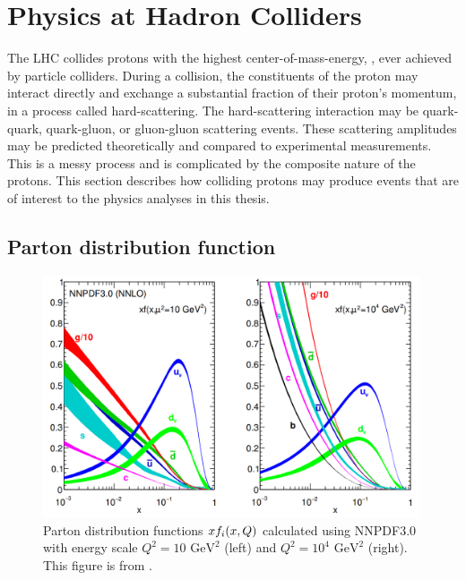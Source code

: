\section{Physics at Hadron Colliders}

The LHC collides protons with the highest center-of-mass-energy, \sqrts, ever achieved by particle colliders.
During a collision, the constituents of the proton may interact directly and exchange a substantial fraction of their proton's momentum, in a process called hard-scattering.
The hard-scattering interaction may be quark-quark, quark-gluon, or gluon-gluon scattering events.
These scattering amplitudes may be predicted theoretically and compared to experimental measurements.
This is a messy process and is complicated by the composite nature of the protons.
This section describes how colliding protons may produce events that are of interest to the physics analyses in this thesis.

\subsection{Parton distribution function}

\begin{figure}[h!]
\captionsetup[subfigure]{position=b}
\centering
\includegraphics[width=0.99\textwidth]{figures/pheno/pdgpdf.png}
\caption{Parton distribution functions $xf_i(x,Q)$ calculated using NNPDF3.0 with energy scale $Q^2=10\text{~GeV}^2$ (left) and $Q^2=10^4\text{~GeV}^2$ (right). This figure is from \cite{Ball:2014uwa}.}
\label{fig:partDistFunc}
\end{figure}

